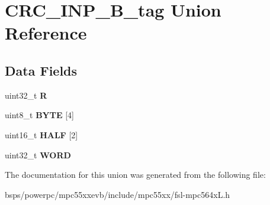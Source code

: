 \hypertarget{unionCRC__INP__32B__tag}{}\section{C\+R\+C\+\_\+\+I\+N\+P\+\_\+B\+\_\+tag Union Reference}
\label{unionCRC__INP__32B__tag}
\subsection*{Data Fields}
\begin{DoxyCompactItemize}
\item 
\mbox{\label{unionCRC__INP__32B__tag_a9194a69632ea893fe9cca3967e32c0ac}} 
uint32\+\_\+t {\bfseries R}
\item 
\mbox{\label{unionCRC__INP__32B__tag_a1f8542932bd0453dcf7bb0981cfd33af}} 
uint8\+\_\+t {\bfseries B\+Y\+TE} \mbox{[}4\mbox{]}
\item 
\mbox{\label{unionCRC__INP__32B__tag_a60afdc7fd078119b5ced8a051037d45b}} 
uint16\+\_\+t {\bfseries H\+A\+LF} \mbox{[}2\mbox{]}
\item 
\mbox{\label{unionCRC__INP__32B__tag_a326b8cfb8d3c0136fe46f2cb3f32fd1b}} 
uint32\+\_\+t {\bfseries W\+O\+RD}
\end{DoxyCompactItemize}


The documentation for this union was generated from the following file\+:\begin{DoxyCompactItemize}
\item 
bsps/powerpc/mpc55xxevb/include/mpc55xx/fsl-\/mpc564x\+L.\+h\end{DoxyCompactItemize}
